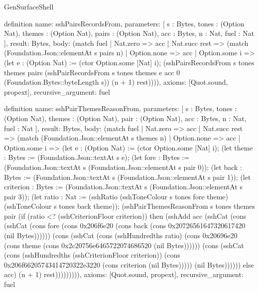 \begin{lexlean}{GenSurfaceShell}
\begin{semanticmodule}
definition{
  name: sshPairsRecordsFrom,
  parameters: [
    s : Bytes,
    tones : (Option Nat),
    themes : (Option Nat),
    pairs : (Option Nat),
    acc : Bytes,
    n : Nat,
    fuel : Nat
  ],
  result: Bytes,
  body: (match fuel
    | Nat.zero => acc
    | Nat.succ rest => (match (Foundation.Json::elementAt s pairs n)
      | Option.none => acc
      | Option.some i => (let e : (Option Nat) := (ctor Option.some [Nat] i); (sshPairsRecordsFrom s tones themes pairs (sshPairRecordsFrom s tones themes e acc 0 (Foundation.Bytes::byteLength s)) (n + 1) rest)))),
  axioms: [Quot.sound, propext],
  recursive_argument: fuel
}

definition{
  name: sshPairThemesReasonFrom,
  parameters: [
    s : Bytes,
    tones : (Option Nat),
    themes : (Option Nat),
    pair : (Option Nat),
    acc : Bytes,
    n : Nat,
    fuel : Nat
  ],
  result: Bytes,
  body: (match fuel
    | Nat.zero => acc
    | Nat.succ rest => (match (Foundation.Json::elementAt s themes n)
      | Option.none => acc
      | Option.some i => (let e : (Option Nat) := (ctor Option.some [Nat] i); (let theme : Bytes := (Foundation.Json::textAt s e); (let fore : Bytes := (Foundation.Json::textAt s (Foundation.Json::elementAt s pair 0)); (let back : Bytes := (Foundation.Json::textAt s (Foundation.Json::elementAt s pair 1)); (let criterion : Bytes := (Foundation.Json::textAt s (Foundation.Json::elementAt s pair 3)); (let ratio : Nat := (sshRatio (sshToneColour s tones fore theme) (sshToneColour s tones back theme)); (sshPairThemesReasonFrom s tones themes pair (if (ratio <? (sshCriterionFloor criterion)) then (sshAdd acc (sshCat (cons (sshCat (cons fore (cons 0x206f6e20 (cons back (cons 0x20726561647320617420 (nil Bytes)))))) (cons (sshCat (cons (sshHundredths ratio) (cons 0x20696e20 (cons theme (cons 0x2c20756e6465722074686520 (nil Bytes)))))) (cons (sshCat (cons (sshHundredths (sshCriterionFloor criterion)) (cons 0x206f66205743414720322e3220 (cons criterion (nil Bytes))))) (nil Bytes)))))) else acc) (n + 1) rest))))))))),
  axioms: [Quot.sound, propext],
  recursive_argument: fuel
}


\end{semanticmodule}
\end{lexlean}
